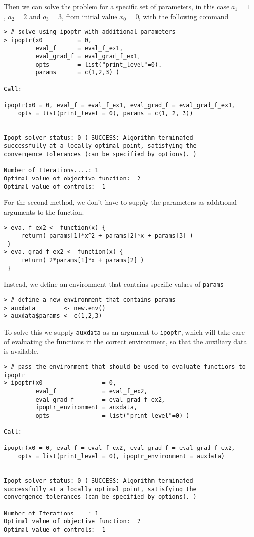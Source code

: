 \documentclass[10pt]{article}
\begin{document}
Then we can solve the problem for a specific set of parameters, in this case 
$a_1=1$, $a_2=2$ and $a_3=3$, from initial value $x_0=0$, with the following 
command
\begin{verbatim}
> # solve using ipoptr with additional parameters
> ipoptr(x0          = 0, 
         eval_f      = eval_f_ex1, 
         eval_grad_f = eval_grad_f_ex1,
         opts        = list("print_level"=0),
         params      = c(1,2,3) )
         
Call:

ipoptr(x0 = 0, eval_f = eval_f_ex1, eval_grad_f = eval_grad_f_ex1, 
    opts = list(print_level = 0), params = c(1, 2, 3))


Ipopt solver status: 0 ( SUCCESS: Algorithm terminated 
successfully at a locally optimal point, satisfying the 
convergence tolerances (can be specified by options). )

Number of Iterations....: 1 
Optimal value of objective function:  2 
Optimal value of controls: -1
\end{verbatim}

For the second method, we don't have to supply the parameters as additional 
arguments to the function.
\begin{verbatim}
> eval_f_ex2 <- function(x) { 
     return( params[1]*x^2 + params[2]*x + params[3] ) 
 }
> eval_grad_f_ex2 <- function(x) { 
     return( 2*params[1]*x + params[2] ) 
 }
\end{verbatim}
Instead, we define an environment that contains specific values of 
\texttt{params}
\begin{verbatim}
> # define a new environment that contains params
> auxdata        <- new.env()
> auxdata$params <- c(1,2,3)
\end{verbatim}
To solve this we supply \texttt{auxdata} as an argument to \texttt{ipoptr}, 
which will take care of evaluating the functions in the correct environment, 
so that the auxiliary data is available.
\begin{verbatim}
> # pass the environment that should be used to evaluate functions to ipoptr
> ipoptr(x0                 = 0, 
         eval_f             = eval_f_ex2, 
         eval_grad_f        = eval_grad_f_ex2, 
         ipoptr_environment = auxdata,
         opts               = list("print_level"=0) )
         
Call:

ipoptr(x0 = 0, eval_f = eval_f_ex2, eval_grad_f = eval_grad_f_ex2, 
    opts = list(print_level = 0), ipoptr_environment = auxdata)


Ipopt solver status: 0 ( SUCCESS: Algorithm terminated 
successfully at a locally optimal point, satisfying the 
convergence tolerances (can be specified by options). )

Number of Iterations....: 1 
Optimal value of objective function:  2 
Optimal value of controls: -1
\end{verbatim}
\end{document}

